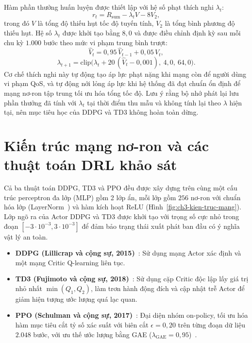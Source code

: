 Hàm phần thưởng huấn luyện được thiết lập với hệ số phạt thích nghi $\lambda_t$:
\begin{equation}
r_t = R_{\mathrm{sum}} - \lambda_t V - 8 V_2 ,
\label{eq:phan-thuong-huan-luyen}
\end{equation}
trong đó $V$ là tổng độ thiếu hụt tốc độ tuyến tính, $V_2$ là tổng bình phương độ thiếu hụt. Hệ số $\lambda_t$
được khởi tạo bằng $8,0$ và được điều chỉnh định kỳ sau mỗi chu kỳ $1.000$ bước theo mức vi phạm trung bình
trượt:
\begin{equation}
\hat{V}_t = 0,95\, \hat{V}_{t-1} + 0,05\, V_t ,
\label{eq:ema}
\end{equation}
\begin{equation}
\lambda_{t+1} = \mathrm{clip}\big(\lambda_t + 20\,(\hat{V}_t - 0,001),\ 4,0,\ 64,0\big).
\label{eq:cap-nhat-lambda}
\end{equation}
Cơ chế thích nghi này tự động tạo áp lực phạt nặng khi mạng còn để người dùng vi phạm QoS, và tự động nới lỏng áp
lực khi hệ thống đã đạt chuẩn ổn định để mạng nơ-ron tập trung tối ưu hóa tổng tốc độ. Lưu ý rằng bộ nhớ phát
lại lưu phần thưởng đã tính với $\lambda_t$ tại thời điểm thu mẫu và không tính lại theo $\lambda$ hiện tại, nên
mục tiêu học của DDPG và TD3 không hoàn toàn dừng.

\section{Kiến trúc mạng nơ-ron và các thuật toán DRL khảo sát}
\label{sec:kien-truc-mang}

Cả ba thuật toán DDPG, TD3 và PPO đều được xây dựng trên cùng một cấu trúc perceptron đa lớp (MLP) gồm 2 lớp ẩn,
mỗi lớp gồm $256$ nơ-ron với chuẩn hóa lớp (LayerNorm~\cite{Ba2016LayerNorm}) và hàm kích hoạt ReLU
(Hình~\ref{fig:ch3-kien-truc-mang}). Lớp ngõ ra của Actor DDPG và TD3 được khởi tạo với trọng số cực nhỏ trong
đoạn $[-3 \cdot 10^{-3}, 3 \cdot 10^{-3}]$ để đảm bảo trạng thái xuất phát ban đầu có ý nghĩa vật lý an toàn.
\begin{itemize}
\item \textbf{DDPG (Lillicrap và cộng sự, 2015)}~\cite{Lillicrap2015DDPG}: Sử dụng mạng Actor xác định và một
  mạng Critic Q-learning liên tục.
\item \textbf{TD3 (Fujimoto và cộng sự, 2018)}~\cite{Fujimoto2018TD3}: Sử dụng cặp Critic độc lập lấy giá trị
  nhỏ nhất $\min(Q_1, Q_2)$, làm trơn hành động đích và cập nhật trễ Actor để giảm hiện tượng ước lượng quá lạc
  quan.
\item \textbf{PPO (Schulman và cộng sự, 2017)}~\cite{Schulman2017PPO}: Đại diện nhóm on-policy, tối ưu hóa hàm
  mục tiêu cắt tỷ số xác suất với biên cắt $\epsilon = 0,20$ trên từng đoạn dữ liệu $2.048$ bước, với ưu thế ước
  lượng bằng GAE ($\lambda_{\mathrm{GAE}} = 0,95$)~\cite{Schulman2016GAE}.
\end{itemize}


